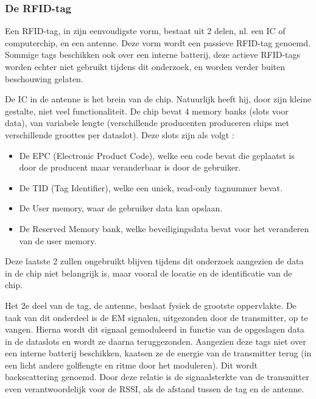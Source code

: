 \subsubsection{De RFID-tag}
Een RFID-tag, in zijn eenvoudigste vorm, bestaat uit 2 delen, nl. een IC of computerchip, en een antenne. Deze vorm wordt een passieve RFID-tag genoemd. Sommige tags beschikken ook over een interne batterij, deze actieve RFID-tags worden echter niet gebruikt tijdens dit onderzoek, en worden verder buiten beschouwing gelaten.\autocite{atlasrfidstore2022} 

De IC in de antenne is het brein van de chip. Natuurlijk heeft hij, door zijn kleine gestalte, niet veel functionaliteit. De chip bevat 4 memory banks (slots voor data), van variabele lengte (verschillende producenten produceren chips met verschillende groottes per dataslot). Deze slots zijn als volgt \autocite{Smiley2017}: 
\begin{itemize}
	\item De EPC (Electronic Product Code), welke een code bevat die geplaatst is door de producent maar veranderbaar is door de gebruiker.
	\item De TID (Tag Identifier), welke een uniek, read-only tagnummer bevat.
	\item De User memory, waar de gebruiker data kan opslaan.
	\item De Reserved Memory bank, welke beveiligingsdata bevat voor het veranderen van de user memory.
\end{itemize}

Deze laatste 2 zullen ongebruikt blijven tijdens dit onderzoek aangezien de data in de chip niet belangrijk is, maar vooral de locatie en de identificatie van de chip.

Het 2e deel van de tag, de antenne, beslaat fysiek de grootste oppervlakte. De taak van dit onderdeel is de EM signalen, uitgezonden door de transmitter, op te vangen. Hierna wordt dit signaal gemoduleerd in functie van de opgeslagen data in de dataslots en wordt ze daarna teruggezonden. Aangezien deze tags niet over een interne batterij beschikken, kaatsen ze de energie van de transmitter terug (in een licht andere golflengte en ritme door het moduleren). Dit wordt backscattering genoemd. Door deze relatie is de signaalsterkte van de transmitter even verantwoordelijk voor de RSSI, als de afstand tussen de tag en de antenne.\autocite{atlasrfidstore2022a}

